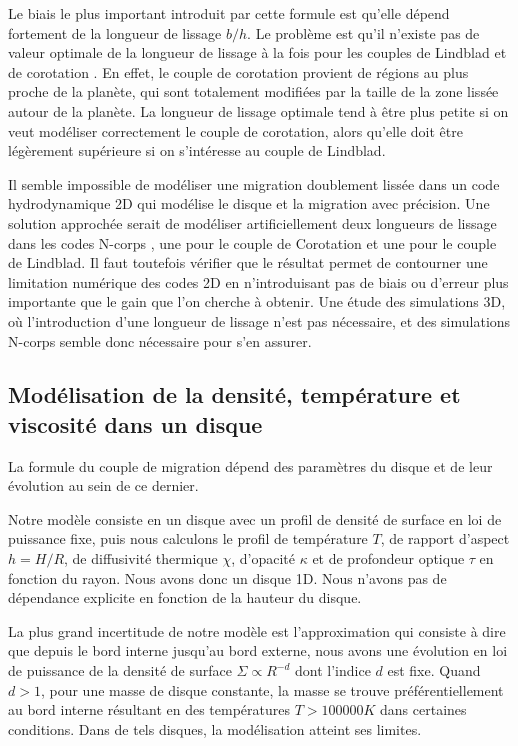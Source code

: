 Le biais le plus important introduit par cette formule est qu'elle dépend fortement de la longueur de lissage $b/h$. Le problème est qu'il n'existe pas de valeur optimale de la longueur de lissage à la fois pour les couples de Lindblad et de corotation \citep{masset2002coorbital}. En effet, le couple de corotation provient de régions au plus proche de la planète, qui sont totalement modifiées par la taille de la zone lissée autour de la planète. La longueur de lissage optimale tend à être plus petite si on veut modéliser correctement le couple de corotation, alors qu'elle doit être légèrement supérieure si on s'intéresse au couple de Lindblad. 

Il semble impossible de modéliser une migration doublement lissée dans un code hydrodynamique 2D qui modélise le disque et la migration avec précision. Une solution approchée serait de modéliser artificiellement deux longueurs de lissage dans les codes N-corps , une pour le couple de Corotation et une pour le couple de Lindblad. Il faut toutefois vérifier que le résultat permet de contourner une limitation numérique des codes 2D en n'introduisant pas de biais ou d'erreur plus importante que le gain que l'on cherche à obtenir. Une étude des simulations 3D, où l'introduction d'une longueur de lissage n'est pas nécessaire, et des simulations N-corps semble donc nécessaire pour s'en assurer. 

\subsection{Modélisation de la densité, température et viscosité dans un disque}
La formule du couple de migration dépend des paramètres du disque et de leur évolution au sein de ce dernier. 

Notre modèle consiste en un disque avec un profil de densité de surface en loi de puissance fixe, puis nous calculons le profil de température $T$, de rapport d'aspect $h=H/R$, de diffusivité thermique $\chi$, d'opacité $\kappa$ et de profondeur optique $\tau$ en fonction du rayon. Nous avons donc un disque 1D. Nous n'avons pas de dépendance explicite en fonction de la hauteur du disque. 

La plus grand incertitude de notre modèle est l'approximation qui consiste à dire que depuis le bord interne jusqu'au bord externe, nous avons une évolution en loi de puissance de la densité de surface $\Sigma\propto R^{-d}$ dont l'indice $d$ est fixe. Quand $d>1$, pour une masse de disque constante, la masse se trouve préférentiellement au bord interne résultant en des températures $T>100 000\unit{K}$ dans certaines conditions. Dans de tels disques, la modélisation atteint ses limites.

